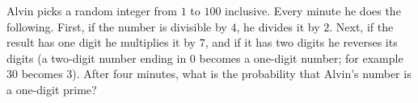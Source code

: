 Alvin picks a random integer from $1$ to $100$ inclusive. Every minute he does the following. First, if the number is divisible by $4$, he divides it by $2$. Next, if the result has one digit he multiplies it by $7$, and if it has two digits he reverses its digits (a two-digit number ending in $0$ becomes a one-digit number; for example $30$ becomes $3$). After four minutes, what is the probability that Alvin's number is a one-digit prime?
